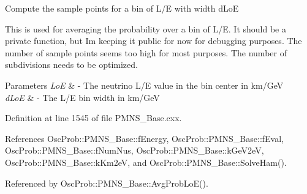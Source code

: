 Compute the sample points for a bin of L/E with width d\+LoE

This is used for averaging the probability over a bin of L/E. It should be a private function, but I\textquotesingle{}m keeping it public for now for debugging purposes. The number of sample points seems too high for most purposes. The number of subdivisions needs to be optimized.


\begin{DoxyParams}{Parameters}
{\em LoE} & -\/ The neutrino L/E value in the bin center in km/\+GeV \\
\hline
{\em d\+LoE} & -\/ The L/E bin width in km/\+GeV \\
\hline
\end{DoxyParams}


Definition at line 1545 of file P\+M\+N\+S\+\_\+\+Base.\+cxx.



References Osc\+Prob\+::\+P\+M\+N\+S\+\_\+\+Base\+::f\+Energy, Osc\+Prob\+::\+P\+M\+N\+S\+\_\+\+Base\+::f\+Eval, Osc\+Prob\+::\+P\+M\+N\+S\+\_\+\+Base\+::f\+Num\+Nus, Osc\+Prob\+::\+P\+M\+N\+S\+\_\+\+Base\+::k\+Ge\+V2eV, Osc\+Prob\+::\+P\+M\+N\+S\+\_\+\+Base\+::k\+Km2eV, and Osc\+Prob\+::\+P\+M\+N\+S\+\_\+\+Base\+::\+Solve\+Ham().



Referenced by Osc\+Prob\+::\+P\+M\+N\+S\+\_\+\+Base\+::\+Avg\+Prob\+Lo\+E().


